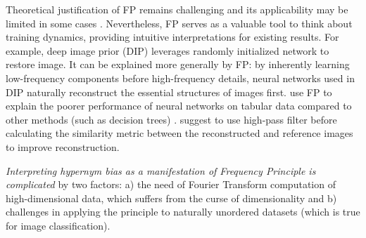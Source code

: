 Theoretical justification of FP remains challenging \citep{xu2024overview} and
its applicability may be limited in some cases \citep{zhang2020rethink, wang2023neural}.
Nevertheless, FP serves as a valuable tool to think about training dynamics,
providing intuitive interpretations for existing results. For example, deep
image prior (DIP) \citep{ulyanov2018deep} leverages randomly initialized network
to restore image. It can be explained more generally by FP: by inherently
learning low-frequency components before high-frequency details, neural networks
used in DIP naturally reconstruct the essential structures of images first.
\cite{beyazit2024inductive} use FP to explain the poorer performance of neural
networks on tabular data compared to other methods (such as decision trees)
\citep{shwartz2022tabular}. \cite{benjdiraa2023guided} suggest to use high-pass
filter before calculating the similarity metric between the reconstructed and
reference images to improve reconstruction.



\textit{Interpreting hypernym bias as a manifestation of Frequency Principle is
  complicated} by two factors: a) the need of Fourier Transform computation of
high-dimensional data, which suffers from the curse of dimensionality and b)
challenges in applying the principle to naturally unordered datasets (which is
true for image classification).

